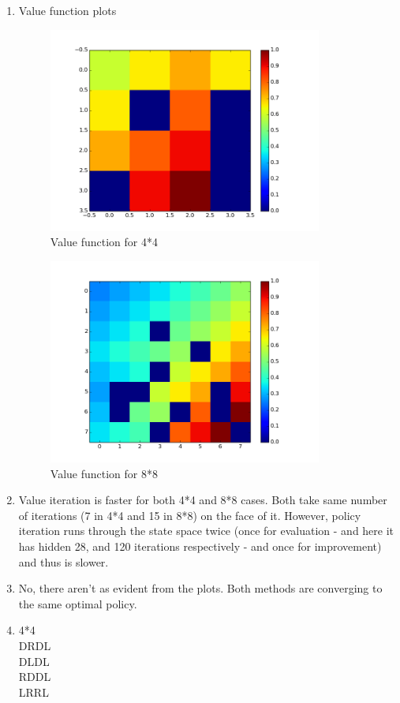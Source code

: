 \documentclass{article}
\begin{document}
\begin{enumerate}[label=(\alph*)]
\item 

Value function plots \\
\begin{figure}[H]
\centering
\includegraphics[width=90mm]{4_4_val_iter.png}
\caption{Value function for 4*4 \label{overflow}}
\end{figure}

\begin{figure}[H]
\centering
\includegraphics[width=90mm]{8_8_val_iter.png}
\caption{Value function for 8*8 \label{overflow}}
\end{figure}

\item 
Value iteration is faster for both 4*4 and 8*8 cases.
Both take same number of iterations (7 in 4*4 and 15 in 8*8) on the face of it. However, policy iteration runs through the state space twice (once for evaluation - and here it has hidden 28, and 120 iterations respectively - and once for improvement) and thus is slower.

\item
No, there aren't as evident from the plots. Both methods are converging to the same optimal policy. 
\item 
4*4\\
DRDL\\
DLDL\\
RDDL\\
LRRL\\


\end{enumerate}
\end{document}

